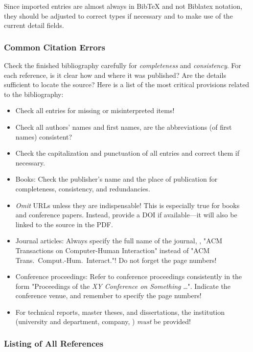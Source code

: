 Since imported entries are almost always in BibTeX and not Biblatex notation,
they should be adjusted to correct types if necessary and to make use of the
current detail fields.

\subsubsection{Common Citation Errors}

Check the finished bibliography carefully for \emph{completeness} and
\emph{consistency}. For each reference, is it clear how and where it was
published? Are the details sufficient to locate the source? Here is a list of
the most critical provisions related to the bibliography:
%
\begin{itemize}
    \item Check all entries for missing or misinterpreted items!
    \item Check all authors' names and first names, are the abbreviations (of
    first names) consistent?
    \item Check the capitalization and punctuation of all entries and correct
    them if necessary.
    \item Books: Check the publisher's name and the place of publication for 
    completeness, consistency, and redundancies.
    \item \emph{Omit} URLs unless they are indispensable! This is especially
    true for books and conference papers. Instead, provide a DOI if
    available---it will also be linked to the source in the PDF.
    \item Journal articles: Always specify the full name of the journal, \eg,
    "ACM Transactions on Computer-Human Interaction" instead of "ACM Trans.\
    Comput.-Hum.\ Interact."! Do not forget the page numbers!
    \item Conference proceedings: Refer to conference proceedings consistently
    in the form "Proceedings of the \emph{XY Conference on Something} \ldots".
    Indicate the conference venue, and remember to specify the page numbers!
    \item For technical reports, master theses, and dissertations, the
    institution (university and department, company, \etc) \emph{must} be
    provided!
\end{itemize}

\subsubsection{Listing of All References}

